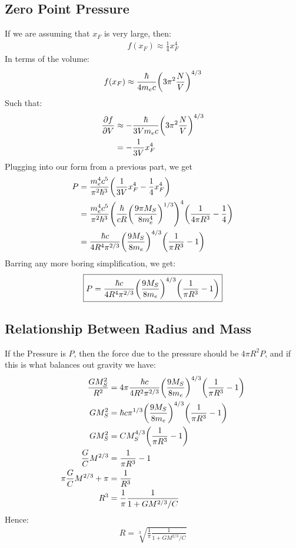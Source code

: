\documentclass[12pt]{article}
\begin{document}
\subsection{Zero Point Pressure}
If we are assuming that $x_F$ is very large, then:
\begin{align*}
  f(x_F)\approx\frac14x_F^4
\end{align*}
In terms of the volume:
\begin{align*}
  f(x_F)\approx\frac{\hbar}{4m_ec}\qty(3\pi^2 \frac{N}{V})^{4/3}
\end{align*}
Such that:
\begin{align*}
  \pdv{f}{V}&\approx-\frac{\hbar}{3Vm_ec}\qty(3\pi^2 \frac{N}{V})^{4/3}\\
  &=-\frac1{3V}x_F^4
\end{align*}
Plugging into our form from a previous part, we get
\begin{align*}
  P&=\frac{m_e^4c^5}{\pi^2\hbar^3}\qty(\frac1{3V}x_F^4-\frac14x_F^4)\\
  &=\frac{m_e^4c^5}{\pi^2\hbar^3}
  \qty(\frac{\hbar}{cR}\qty(\frac{9\pi M_S}{8m_e^4})^{1/3})^4
  \qty(\frac1{4\pi R^3}-\frac14)\\
  &=\frac{\hbar c}{4R^4\pi^{2/3}}\qty(\frac{9M_S}{8m_e})^{4/3}
  \qty(\frac1{\pi R^3}-1)
\end{align*}
Barring any more boring simplification, we get:
\begin{align}
  \boxed{P=\frac{\hbar c}{4R^4\pi^{2/3}}\qty(\frac{9M_S}{8m_e})^{4/3}
  \qty(\frac1{\pi R^3}-1)}
\end{align}
\subsection{Relationship Between Radius and Mass}
If the Pressure is $P$, then the force due to the pressure should be $4\pi R^2 P$, and if this is what balances out gravity we have:
\begin{align*}
  \frac{GM_S^2}{R^2}&=4\pi\frac{\hbar c}{4R^2\pi^{2/3}}
  \qty(\frac{9M_S}{8m_e})^{4/3}\qty(\frac1{\pi R^3}-1)\\
  GM_S^2&=\hbar c\pi^{1/3}
  \qty(\frac{9M_S}{8m_e})^{4/3}\qty(\frac1{\pi R^3}-1)\\
  GM_S^2&=CM_S^{4/3}\qty(\frac{1}{\pi R^3}-1)\\
  \frac{G}{C}M^{2/3}&=\frac{1}{\pi R^3}-1\\
  \pi\frac{G}{C}M^{2/3}+\pi&=\frac{1}{R^3}\\
  R^3&=\frac1\pi\frac1{1+GM^{2/3}/C}
\end{align*}
Hence:
\begin{align}
  \boxed{R=\sqrt[3]{\frac1\pi\frac1{1+GM^{2/3}/C}}}
\end{align}
\end{document}
